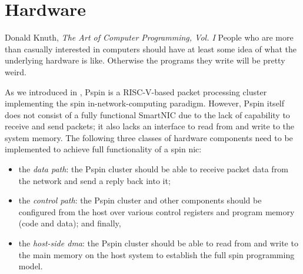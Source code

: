 \chapter{Hardware} \label{chap:hardware}
\begin{chapquote}{Donald Knuth, \textit{The Art of Computer Programming, Vol. I}}
People who are more than casually interested in computers should have at least some idea of what the underlying hardware is like. Otherwise the programs they write will be pretty weird.
\end{chapquote}


As we introduced in , P\acs{spin} is a RISC-V-based packet processing cluster implementing the \ac{spin} in-network-computing paradigm.  However, P\acs{spin} itself does not consist of a fully functional SmartNIC due to the lack of capability to receive and send packets; it also lacks an interface to read from and write to the system memory.  The following three classes of hardware components need to be implemented to achieve full functionality of a \ac{spin} \ac{nic}: 

\begin{itemize}
    \item the \emph{data path}: the P\acs{spin} cluster should be able to receive packet data from the network and send a reply back into it;
    \item the \emph{control path}: the P\acs{spin} cluster and other components should be configured from the host over various control registers and program memory (code and data); and finally,
    \item the \emph{host-side \ac{dma}}: the P\acs{spin} cluster should be able to read from and write to the main memory on the host system to establish the full \ac{spin} programming model.
\end{itemize}

